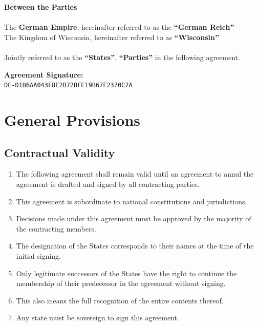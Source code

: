 \documentclass{article}
\begin{document}
\begin{center}
\begin{minipage}{0.45\textwidth}
    \end{minipage}
\end{center}


\begin{center}
    \textbf{Between the Parties\\}\textbf{\\}
    The \textbf{German Empire}, hereinafter referred to as the \textbf{``German Reich''\\}
    The Kingdom of Wisconsin, hereinafter referred to as \textbf{``Wisconsin''\\}
    \textbf{\\}
    Jointly referred to as the \textbf{``States''}, \textbf{``Parties''} in the following agreement.

\end{center}
\newpage
{}
\vspace*{\fill}
\begin{Center}
\textbf{Agreement Signature:\\}
\texttt{DE-D1B6AA043F8E2B72BFE19B67F2370C7A}
\vspace*{\fill}
\end{Center}
\newpage
\section{General Provisions}
\subsection{Contractual Validity}
\begin{enumerate}[(1)]
    \item The following agreement shall remain valid until an agreement to annul the agreement is drafted and signed by all contracting parties.
    \item This agreement is subordinate to national constitutions and jurisdictions.
    \item Decisions made under this agreement must be approved by the majority of the contracting members.
    \item The designation of the States corresponds to their names at the time of the initial signing.
    \item Only legitimate successors of the States have the right to continue the membership of their predecessor in the agreement without signing.
    \item This also means the full recognition of the entire contents thereof.
    \item Any state must be sovereign to sign this agreement.
\end{enumerate}
\end{document}
